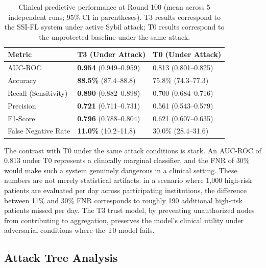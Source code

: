 \documentclass{sbc2023}
\begin{document}
\begin{table}[!ht]
\caption{Clinical predictive performance at Round 100 (mean across 5 independent runs; 95\% CI in parentheses). T3 results correspond to the SSI-FL system under active Sybil attack; T0 results correspond to the unprotected baseline under the same attack.}
\label{tab:clinical}
\centering
\begin{tabularx}{\columnwidth}{lXX}
\toprule
\textbf{Metric} & \textbf{T3 (Under Attack)} & \textbf{T0 (Under Attack)} \\
\midrule
AUC-ROC & \textbf{0.954} (0.949--0.959) & 0.813 (0.801--0.825) \\
Accuracy & \textbf{88.5\%} (87.4--88.8) & 75.8\% (74.3--77.3) \\
Recall (Sensitivity) & \textbf{0.890} (0.882--0.898) & 0.700 (0.684--0.716) \\
Precision & \textbf{0.721} (0.711--0.731) & 0.561 (0.543--0.579) \\
F1-Score & \textbf{0.796} (0.788--0.804) & 0.621 (0.607--0.635) \\
False Negative Rate & \textbf{11.0\%} (10.2--11.8) & 30.0\% (28.4--31.6) \\
\bottomrule
\end{tabularx}
\end{table}

The contrast with T0 under the same attack conditions is stark. An AUC-ROC of 0.813 under T0 represents a clinically marginal classifier, and the FNR of 30\% would make such a system genuinely dangerous in a clinical setting. These numbers are not merely statistical artifacts: in a scenario where 1,000 high-risk patients are evaluated per day across participating institutions, the difference between 11\% and 30\% FNR corresponds to roughly 190 additional high-risk patients missed per day. The T3 trust model, by preventing unauthorized nodes from contributing to aggregation, preserves the model's clinical utility under adversarial conditions where the T0 model fails.

\subsection{Attack Tree Analysis}
\end{document}
